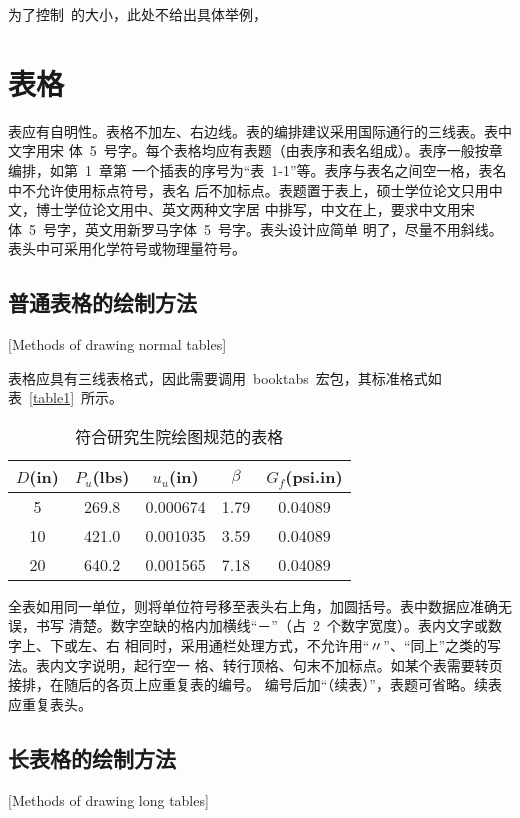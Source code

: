 为了控制\hithesis\ 的大小，此处不给出具体举例，

\section{表格}

表应有自明性。表格不加左、右边线。表的编排建议采用国际通行的三线表。表中文字用宋
体~5~号字。每个表格均应有表题（由表序和表名组成）。表序一般按章编排，如第~1~章第
一个插表的序号为“表~1-1”等。表序与表名之间空一格，表名中不允许使用标点符号，表名
后不加标点。表题置于表上，硕士学位论文只用中文，博士学位论文用中、英文两种文字居
中排写，中文在上，要求中文用宋体~5~号字，英文用新罗马字体~5~号字。表头设计应简单
明了，尽量不用斜线。表头中可采用化学符号或物理量符号。


\subsection{普通表格的绘制方法}[Methods of drawing normal tables]

表格应具有三线表格式，因此需要调用~booktabs~宏包，其标准格式如表~\ref{table1}~所示。
\begin{table}[htbp]
	\caption{符合研究生院绘图规范的表格}
	\vspace{0.5ex}\centering\wuhao
	\begin{tabular}{ccccc}
		\toprule[1.5pt]
		$D$(in) & $P_u$(lbs) & $u_u$(in) & $\beta$ & $G_f$(psi.in) \\
		\midrule[1pt]
		5       & 269.8      & 0.000674  & 1.79    & 0.04089       \\
		10      & 421.0      & 0.001035  & 3.59    & 0.04089       \\
		20      & 640.2      & 0.001565  & 7.18    & 0.04089       \\
		\bottomrule[1.5pt]
	\end{tabular}
\end{table}
全表如用同一单位，则将单位符号移至表头右上角，加圆括号。表中数据应准确无误，书写
清楚。数字空缺的格内加横线“－”（占~2~个数字宽度）。表内文字或数字上、下或左、右
相同时，采用通栏处理方式，不允许用“〃”、“同上”之类的写法。表内文字说明，起行空一
格、转行顶格、句末不加标点。如某个表需要转页接排，在随后的各页上应重复表的编号。
编号后加“（续表）”，表题可省略。续表应重复表头。

\subsection{长表格的绘制方法}[Methods of drawing long tables]

